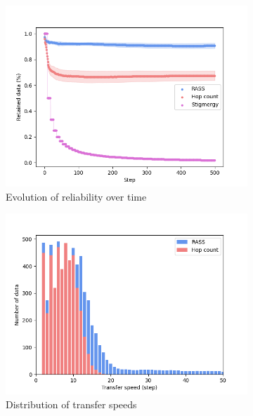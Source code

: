 \documentclass[letterpaper, 10 pt, conference]{ieeeconf}
\begin{document}
\begin{figure}
    \centering
    \begin{subfigure}{0.30\textwidth}
        \includegraphics[width=\textwidth]{figures/lennard_reliability.png}
        \caption{Evolution of reliability over time}
        \label{results:lennard_100_reliability}
    \end{subfigure}
    \begin{subfigure}{0.30\textwidth}
        \includegraphics[width=\textwidth]{figures/lennard_speed.png}
        \caption{Distribution of transfer speeds}
        \label{results:lennard_100_speed}
    \end{subfigure}
    \begin{subfigure}{0.30\textwidth}

\end{subfigure}
\end{figure}
\end{document}
